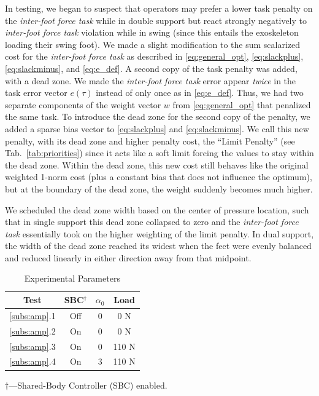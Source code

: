 \documentclass[utf8]{frontiersSCNS}
\begin{document}
In testing, we began to suspect that operators may prefer a lower task penalty on the \emph{inter-foot force task} while in double support but react strongly negatively to \emph{inter-foot force task} violation while in swing (since this entails the exoskeleton loading their swing foot).
We made a slight modification to the sum scalarized cost for the \emph{inter-foot force task} as described in \eqref{eq:general_opt}, \eqref{eq:slackplus}, \eqref{eq:slackminus}, and \eqref{eq:e_def}. 
A second copy of the task penalty was added, with a dead zone. We made the \emph{inter-foot force task} error appear \emph{twice} in the task error vector $e(\tau)$ instead of only once as in \eqref{eq:e_def}. Thus, we had two separate components of the weight vector $w$ from \eqref{eq:general_opt} that penalized the same task. To introduce the dead zone for the second copy of the penalty, we added a sparse bias vector to \eqref{eq:slackplus} and \eqref{eq:slackminus}. We call this new penalty, with its dead zone and higher penalty cost, the ``Limit Penalty'' (see Tab.~\ref{tab:priorities}) since it acts like a soft limit forcing the values to stay within the dead zone. Within the dead zone, this new cost still behaves like the original weighted 1-norm cost (plus a constant bias that does not influence the optimum), but at the boundary of the dead zone, the weight suddenly becomes much higher.

We scheduled the dead zone width based on the center of pressure location, such that in single support this dead zone collapsed to zero and the \emph{inter-foot force task} essentially took on the higher weighting of the limit penalty. In dual support, the width of the dead zone reached its widest when the feet were evenly balanced and reduced linearly in either direction away from that midpoint. 



\begin{table}\centering
\begin{tabular}{cccc}
			\toprule
			Test & SBC$^\dagger$ & $\alpha_0$ & Load\\
			\midrule
			\ref{subs:amp}.1 & Off & 0 & 0 N\\
			\ref{subs:amp}.2 & On & 0 & 0 N\\
			\ref{subs:amp}.3 & On & 0 & 110 N\\
			\ref{subs:amp}.4 & On & 3 & 110 N\\
			\bottomrule
		\end{tabular}
		
		\scriptsize$\dagger$---Shared-Body Controller (SBC) enabled.
		\caption{Experimental Parameters}\label{tab:expparam}
\end{table}
\end{document}
